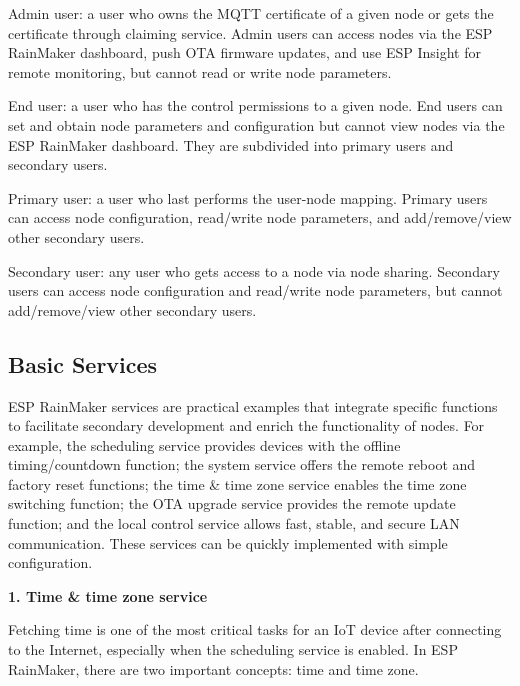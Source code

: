 \documentclass[a4paper,12pt]{book}
\begin{document}
\begin{term}{Admin user: }
    a user who owns the MQTT certificate of a given node or gets the certificate through claiming service. Admin users can access nodes via the ESP RainMaker dashboard, push OTA firmware updates, and use ESP Insight for remote monitoring, but cannot read or write node parameters.
\end{term}

\begin{term}{End user:}
    a user who has the control permissions to a given node. End users can set and obtain node parameters and configuration but cannot view nodes via the ESP RainMaker dashboard. They are subdivided into primary users and secondary users.

    \parskip 6pt
    \begin{secterm}{Primary user:}
        a user who last performs the user-node mapping. Primary users can access node configuration, read/write node parameters, and add/remove/view other secondary users.
    \end{secterm}

    \begin{secterm}{Secondary user:}
        any user who gets access to a node via node sharing. Secondary users can access node configuration and read/write node parameters, but cannot add/remove/view other secondary users.
    \end{secterm}
\end{term}

\subsection{Basic Services}
ESP RainMaker services are practical examples that integrate specific functions to facilitate secondary development and enrich the functionality of nodes. For example, the scheduling service provides devices with the offline timing/countdown function; the system service offers the remote reboot and factory reset functions; the time \& time zone service enables the time zone switching function; the OTA upgrade service provides the remote update function; and the local control service allows fast, stable, and secure LAN communication. These services can be quickly implemented with simple configuration.

\textbf{1.	Time \& time zone service}

Fetching time is one of the most critical tasks for an IoT device after connecting to the Internet, especially when the scheduling service is enabled. In ESP RainMaker, there are two important concepts: time and time zone.
\end{document}
